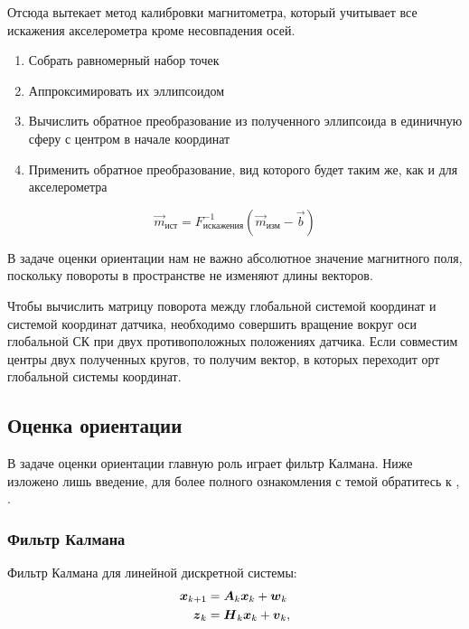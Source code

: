 \documentclass[12pt,a4paper]{article}
\begin{document}
Отсюда вытекает метод калибровки магнитометра, который учитывает все искажения акселерометра кроме несовпадения осей. 

\begin{enumerate}
	\item Собрать равномерный набор точек
	\item Аппроксимировать их эллипсоидом
	\item Вычислить обратное преобразование из полученного эллипсоида в единичную сферу с центром в начале координат
	\item Применить обратное преобразование, вид которого будет таким же, как и для акселерометра
\end{enumerate}

$$ \vec{m}_{\text{ист}} = F_{\text{искажения}}^{-1}(\vec{m}_{\text{изм}} - \vec{b}) $$

В задаче оценки ориентации нам не важно абсолютное значение магнитного поля, поскольку повороты в пространстве не изменяют длины векторов.

Чтобы вычислить матрицу поворота между глобальной системой координат и системой координат датчика, необходимо совершить вращение вокруг оси глобальной СК при двух противоположных положениях датчика. Если совместим центры двух полученных кругов, то получим вектор, в которых переходит орт глобальной системы координат.

\subsection{Оценка ориентации}

В задаче оценки ориентации главную роль играет фильтр Калмана. Ниже изложено лишь введение, для более полного ознакомления с темой обратитесь к \cite{maybeck79}, \cite{brown92}.

\subsubsection{Фильтр Калмана}

Фильтр Калмана для линейной дискретной системы:
\begin{align}
	\label{eq:kalman_state_evolution} \boldsymbol x_{k+1} &= \boldsymbol A_k \boldsymbol x_k + \boldsymbol w_k \\ 
	\label{eq:kalman_measurement} \boldsymbol z_k &= \boldsymbol H_k \boldsymbol x_k + \boldsymbol v_k, \\
\notag
\end{align}
\end{document}
